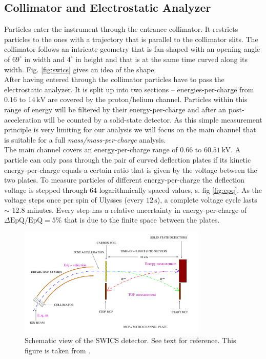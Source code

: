 \subsection{Collimator and Electrostatic Analyzer}
\label{sec:EpQ}
Particles enter the instrument through the entrance collimator. It restricts particles to the ones with a trajectory that is parallel to the collimator slits.  The collimator follows an intricate geometry that is fan-shaped with an opening angle of $69^\circ$ in width and $4^\circ$ in height and that is at the same time curved along its width. Fig. \ref{fig:swics} gives an idea of the shape.\\
After having entered through the collimator particles have to pass the electrostatic analyzer. It is split up into two sections -- energies-per-charge from $0.16$ to $14\,\mathrm{kV}$ are covered by the proton/helium channel. Particles within this range of energy will be filtered by their energy-per-charge and after an post-acceleration will be counted by a solid-state detector. As this simple measurement principle is very limiting for our analysis we will focus on the main channel that is suitable for a full \textit{mass/mass-per-charge} analysis.\\
The main channel covers an energy-per-charge range of $0.66$ to $60.51\,\mathrm{kV}$. A particle can only pass through the pair of curved deflection plates if its kinetic energy-per-charge equals a certain ratio that is given by the voltage between the two plates. To measure particles of different energy-per-charge the deflection voltage is stepped through 64 logarithmically spaced values, s. fig \ref{fig:epq}. As the voltage steps once per spin of Ulysses (every $12\,\mathrm{s}$), a complete voltage cycle lasts $\sim$ 12.8 minutes. 
Every step has a relative uncertainty in energy-per-charge of $\Delta \mathrm{EpQ / EpQ = 5\%}$  that is due to the finite space between the plates.
%
%
%
\begin{figure}[h]
	\includegraphics[width=0.8\textwidth]{Figures/Lars_Swics.png}
	\centering
	\caption{Schematic view of the SWICS detector. See text for reference. This figure is taken from \citet{lars-phd}.}
	\label{fig:lars_swics}
\end{figure}

